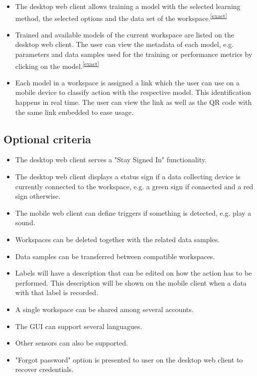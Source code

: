 \begin{itemize}
    \item The desktop web client allows training a model with the selected learning method, the selected options and the data set of the workspace.\textsuperscript{\ref{exact}}
    \item Trained and available models of the current workspace are listed on the desktop web client. The user can view the metadata of each model, e.g. parameters and data samples used for the training or performance metrics by clicking on the model.\textsuperscript{\ref{exact}}
    \item Each model in a workspace is assigned a link which the user can use on a mobile device to classify action with the respective model. This identification happens in real time. The user can view the link as well as the QR code with the same link embedded to ease usage.
\end{itemize}

\subsection{Optional criteria}
\begin{itemize}
    \item The desktop web client serves a "Stay Signed In" functionality.
    \item The desktop web client displays a status sign if a data collecting device is currently connected to the workspace, e.g. a green sign if connected and a red sign otherwise.
    \item The mobile web client can define triggers if something is detected, e.g. play a sound.
    \item Workspaces can be deleted together with the related data samples.
    \item Data samples can be transferred between compatible workspaces.
    \item Labels will have a description that can be edited on how the action has to be performed. This description will be shown on the mobile client when a data with that label is recorded.
    \item A single workspace can be shared among several accounts.
    \item The GUI can support several languagues.
    \item Other sensors can also be supported.
    \item "Forgot password" option is presented to user on the desktop web client to recover credentials.
\end{itemize}

